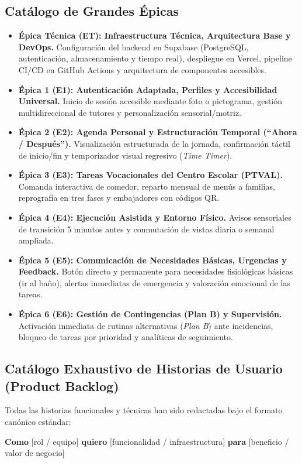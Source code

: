 \documentclass[11pt,a4paper]{article}
\begin{document}
\subsection{Catálogo de Grandes Épicas}
\begin{itemize}
\item \textbf{Épica Técnica (ET): Infraestructura Técnica, Arquitectura Base y DevOps.} Configuración del backend en Supabase (PostgreSQL, autenticación, almacenamiento y tiempo real), despliegue en Vercel, pipeline CI/CD en GitHub Actions y arquitectura de componentes accesibles.
\item \textbf{Épica 1 (E1): Autenticación Adaptada, Perfiles y Accesibilidad Universal.} Inicio de sesión accesible mediante foto o pictograma, gestión multidireccional de tutores y personalización sensorial/motriz.
\item \textbf{Épica 2 (E2): Agenda Personal y Estructuración Temporal (``Ahora / Después'').} Visualización estructurada de la jornada, confirmación táctil de inicio/fin y temporizador visual regresivo (\textit{Time Timer}).
\item \textbf{Épica 3 (E3): Tareas Vocacionales del Centro Escolar (PTVAL).} Comanda interactiva de comedor, reparto mensual de menús a familias, reprografía en tres fases y embajadores con códigos QR.
\item \textbf{Épica 4 (E4): Ejecución Asistida y Entorno Físico.} Avisos sensoriales de transición 5 minutos antes y conmutación de vistas diaria o semanal ampliada.
\item \textbf{Épica 5 (E5): Comunicación de Necesidades Básicas, Urgencias y Feedback.} Botón directo y permanente para necesidades fisiológicas básicas (ir al baño), alertas inmediatas de emergencia y valoración emocional de las tareas.
\item \textbf{Épica 6 (E6): Gestión de Contingencias (Plan B) y Supervisión.} Activación inmediata de rutinas alternativas (\textit{Plan B}) ante incidencias, bloqueo de tareas por prioridad y analíticas de seguimiento.
\end{itemize}

\subsection{Catálogo Exhaustivo de Historias de Usuario (Product Backlog)}
Todas las historias funcionales y técnicas han sido redactadas bajo el formato canónico estándar:

\textbf{Como} [rol / equipo] \quad \textbf{quiero} [funcionalidad / infraestructura] \quad \textbf{para} [beneficio / valor de negocio]
\end{document}
